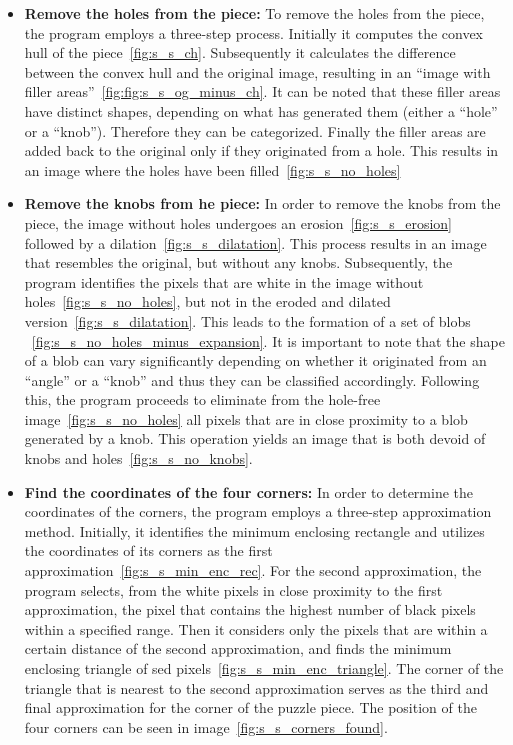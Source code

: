 \documentclass{article}
\begin{document}
\begin{itemize}

  \item \textbf{Remove the holes from the piece:}\newline
  To remove the holes from the piece, the program employs a three-step process. Initially it
  computes the convex hull of the piece~\cref{fig:s_s_ch}.
  Subsequently it calculates the difference between the convex hull and the original image,
  resulting in an ``image with filler areas''~\cref{fig:fig:s_s_og_minus_ch}.
  It can be noted that these filler areas have distinct shapes,
  depending on what has generated them (either a ``hole'' or a ``knob'').
  Therefore they can be categorized.
  Finally the filler areas are added back to the original only if
  they originated from a hole. This results in an image where the holes
  have been filled~\cref{fig:s_s_no_holes}

  \item \textbf{Remove the knobs from he piece:}\newline
  In order to remove the knobs from the piece, the image without holes
  undergoes an erosion~\cref{fig:s_s_erosion} followed by a dilation~\cref{fig:s_s_dilatation}.
  This process results in an image that resembles the original, but without any knobs.
  Subsequently, the program identifies the pixels that are white in the image without holes~\cref{fig:s_s_no_holes},
  but not in the eroded and dilated version~\cref{fig:s_s_dilatation}.
  This leads to the formation of a set of blobs ~\cref{fig:s_s_no_holes_minus_expansion}.
  It is important to note that the shape of a blob can vary significantly depending on whether it originated
  from an ``angle'' or a ``knob'' and thus they can be classified accordingly.
  Following this, the program proceeds to eliminate from the hole-free
  image~\cref{fig:s_s_no_holes} all pixels that are in close proximity to a blob generated by a knob.
  This operation yields an image that is both devoid of knobs and holes~\cref{fig:s_s_no_knobs}.
  
  \item \textbf{Find the coordinates of the four corners:}\newline
  In order to determine the coordinates of the corners,
  the program employs a three-step approximation method.
  Initially, it identifies the minimum enclosing rectangle and
  utilizes the coordinates of its corners
  as the first approximation~\cref{fig:s_s_min_enc_rec}.\newline
  For the second approximation, the program selects,
  from the white pixels in close proximity to the first approximation,
  the pixel that contains the highest number of black pixels
  within a specified range.
  Then it considers only the pixels that are within a certain
  distance of the second approximation, and finds the minimum
  enclosing triangle of sed pixels~\cref{fig:s_s_min_enc_triangle}.\newline
  The corner of the triangle that is nearest to the second
  approximation serves as the third and final approximation
  for the corner of the puzzle piece.
  The position of the four corners can be seen in image~\cref{fig:s_s_corners_found}.


\end{itemize}
\end{document}
